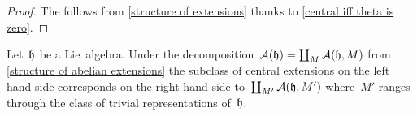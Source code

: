 \begin{proof}
  The  follows from \cref{structure of extensions} thanks to \cref{central iff theta is zero}.
\end{proof}


\begin{remark}
  Let~$\mathfrak{h}$ be a Lie~algebra.
  Under the decomposition~$\mathcal{A}(\mathfrak{h}) = \coprod_M \mathcal{A}(\mathfrak{h}, M)$ from \cref{structure of abelian extensions} the subclass of central extensions on the left hand side corresponds on the right hand side to~$\coprod_{M'} \mathcal{A}(\mathfrak{h}, M')$ where~$M'$ ranges through the class of trivial representations of~$\mathfrak{h}$.
\end{remark}



